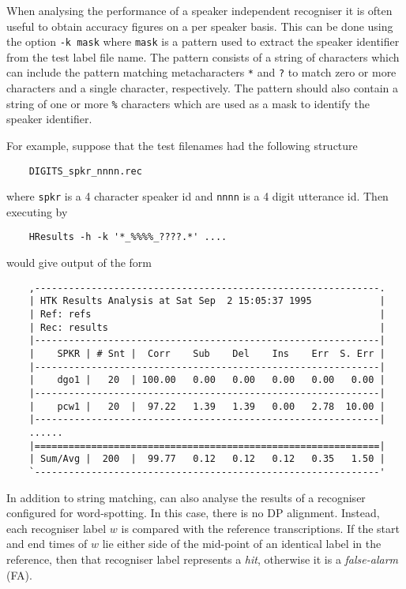 When analysing the performance of a speaker independent recogniser
it is often useful to obtain accuracy figures on a per speaker basis.
This can be done using the option \texttt{-k mask} where \texttt{mask}
is a pattern used to extract 
the speaker identifier from the test label file name.  
The pattern consists of a string of characters which can include
the pattern matching metacharacters 
\texttt{*} and \texttt{?} to match zero or more characters and a single character,
respectively.
The pattern
should also contain a string of one or more \texttt{\%} characters which
are used as a mask to identify the speaker identifier.  

For example,
suppose that the test filenames had the following structure
\begin{verbatim}
    DIGITS_spkr_nnnn.rec
\end{verbatim}
where \texttt{spkr} is a 4 character speaker id and \texttt{nnnn}
is a 4 digit utterance id.  Then executing  by
\begin{verbatim}
    HResults -h -k '*_%%%%_????.*' ....
\end{verbatim}
would give output of the form
\begin{verbatim}
    ,-------------------------------------------------------------.
    | HTK Results Analysis at Sat Sep  2 15:05:37 1995            |
    | Ref: refs                                                   |
    | Rec: results                                                |
    |-------------------------------------------------------------|
    |    SPKR | # Snt |  Corr    Sub    Del    Ins    Err  S. Err |
    |-------------------------------------------------------------|
    |    dgo1 |   20  | 100.00   0.00   0.00   0.00   0.00   0.00 |
    |-------------------------------------------------------------|
    |    pcw1 |   20  |  97.22   1.39   1.39   0.00   2.78  10.00 |
    |-------------------------------------------------------------|
    ......
    |=============================================================|
    | Sum/Avg |  200  |  99.77   0.12   0.12   0.12   0.35   1.50 |
    `-------------------------------------------------------------'
\end{verbatim}

In addition to string matching,  can also 
analyse the results of a recogniser configured for word-spotting.
In this case, there is no DP alignment.  Instead, each recogniser
label $w$ is compared with the reference transcriptions.
If the start and end times of $w$ lie either side of the mid-point
of an identical label in the reference, then that recogniser label
represents a \textit{hit}, otherwise it is a \textit{false-alarm} (FA).

